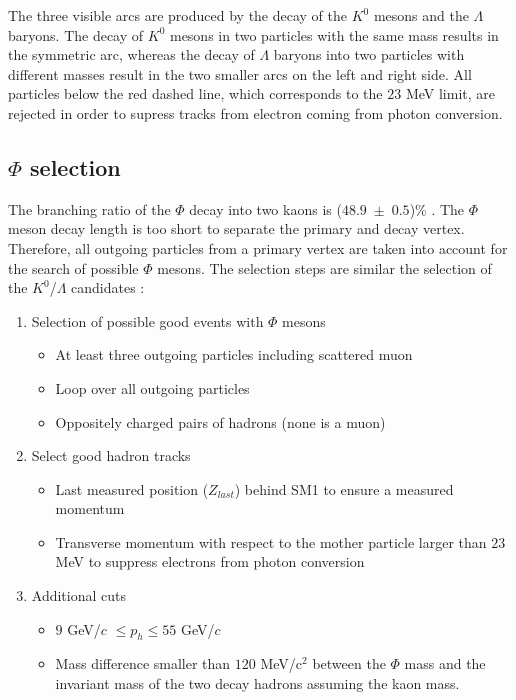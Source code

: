 The three visible arcs are produced by the decay of the $K^0$ mesons and the $\Lambda$ baryons. The decay of $K^0$ mesons in two particles with the same mass results in the symmetric arc, whereas the decay of $\Lambda$ baryons into two particles with different masses result in the two smaller arcs on the left and right side. All particles below the red dashed line, which corresponds to the $23$ MeV limit, are rejected in order to supress tracks from electron coming from photon conversion.

\subsection{$\Phi$ selection}

The branching ratio of the $\Phi$ decay into two kaons is ($48.9$~$\pm$~$0.5$)\% \cite{PDG}. The $\Phi$ meson decay length is too short to separate the primary and decay vertex. Therefore, all outgoing particles from a primary vertex are taken into account for the search of possible $\Phi$ mesons. The selection steps are similar the selection of the $K^0$/$\Lambda$ candidates :

\begin{enumerate}
  \item Selection of possible good events with $\Phi$ mesons
  \begin{itemize}
    \item At least three outgoing particles including scattered muon
    \item Loop over all outgoing particles
    \item Oppositely charged pairs of hadrons (none is a muon)
  \end{itemize}
  \item Select good hadron tracks
  \begin{itemize}
    \item Last measured position ($Z_{last}$) behind SM1 to ensure a measured momentum
    \item Transverse momentum with respect to the mother particle larger than $23$ MeV to suppress electrons from photon conversion
  \end{itemize}
  \item Additional cuts
  \begin{itemize}
    \item $9$ GeV/$c$ $\leq p_h \leq 55$ GeV/$c$
    \item Mass difference smaller than $120$ MeV/c$^2$ between the $\Phi$ mass and the invariant mass of the two decay hadrons assuming the kaon mass.
  \end{itemize}
\end{enumerate}

